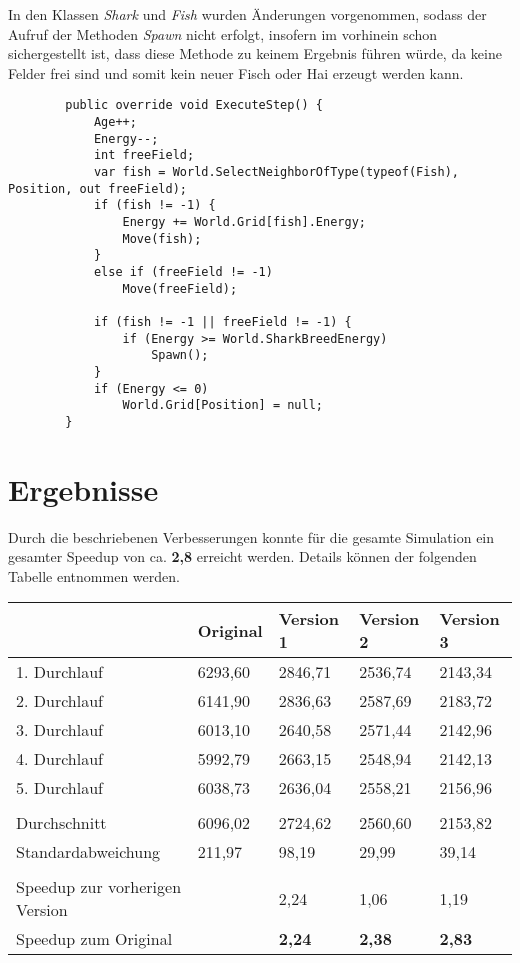 \documentclass[a4paper,ngerman]{scrartcl}
\begin{document}
In den Klassen \textit{Shark} und \textit{Fish} wurden Änderungen vorgenommen, sodass der Aufruf der Methoden \textit{Spawn} nicht erfolgt, insofern im vorhinein schon sichergestellt ist, dass diese Methode zu keinem Ergebnis führen würde, da keine Felder frei sind und somit kein neuer Fisch oder Hai erzeugt werden kann.

\begin{lstlisting}
        public override void ExecuteStep() {
            Age++;
            Energy--;
            int freeField;
            var fish = World.SelectNeighborOfType(typeof(Fish), Position, out freeField);
            if (fish != -1) {
                Energy += World.Grid[fish].Energy;
                Move(fish);
            }
            else if (freeField != -1)
                Move(freeField);

            if (fish != -1 || freeField != -1) {
                if (Energy >= World.SharkBreedEnergy)
                    Spawn();
            }
            if (Energy <= 0)
                World.Grid[Position] = null;
        }
\end{lstlisting}

\section{Ergebnisse}
Durch die beschriebenen Verbesserungen konnte für die gesamte Simulation ein gesamter Speedup von ca. \textbf{2,8} erreicht werden. Details können der folgenden Tabelle entnommen werden.
\\

\centering
\begin{tabular}{l|llll}
                               & Original  & Version 1 & Version 2 & Version 3 \\ \hline
1. Durchlauf                   & 6293,60 & 2846,71 & 2536,74 & 2143,34 \\
2. Durchlauf                   & 6141,90 & 2836,63 & 2587,69 & 2183,72 \\
3. Durchlauf                   & 6013,10 & 2640,58 & 2571,44 & 2142,96 \\
4. Durchlauf                   & 5992,79 & 2663,15 & 2548,94 & 2142,13 \\
5. Durchlauf                   & 6038,73 & 2636,04 & 2558,21& 2156,96\\
                               &           &           &           &           \\
Durchschnitt                   & 6096,02 & 2724,62 & 2560,60 & 2153,82 \\
Standardabweichung             & 211,97   & 98,19  & 29,99  & 39,14   \\
                               &           &           &           &           \\
Speedup zur vorherigen Version &           & 2,24	    & 1,06	   & 1,19    \\
Speedup zum Original           &           & \textbf{2,24}    & \textbf{2,38}    & \textbf{2,83}   
\end{tabular}
\end{document}
